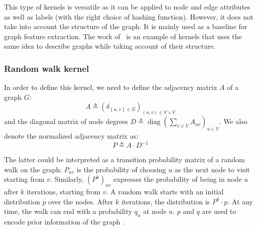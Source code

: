             This type of kernels is versatile as it can be applied to node and edge attributes as well as labels (with the right choice of hashing function).
            However, it does not take into account the structure of the graph.
            It is mainly used as a baseline for graph feature extraction.
            The work of~\textcite{shervashidze2011weisfeiler} is an example of kernels that uses the same idea to describe graphs while taking account of their structure.

        \subsubsection{Random walk kernel}
            In order to define this kernel, we need to define the adjacency matrix $A$ of a graph $G$:
            \begin{equation}
                \label{eq::adjacency_matrix}
                A \triangleq \left(\delta_{\left\{u,v\right\}\in E}\right)_{(u, v) \in V\times V}
            \end{equation}
            and the diagonal matrix of node degrees $D\triangleq \operatorname{diag}\left(\sum_{v \in V}A_{uv}\right)_{u \in V}$.
            We also denote the normalized adjacency matrix as:
            \begin{equation}
                \label{eq::normalized_adjacency_matrix}
                P \triangleq A\cdot D^{-1}
            \end{equation}

            The latter could be interpreted as a transition probability matrix of a random walk on the graph:
            $P_{uv}$ is the probability of choosing $u$ as the next node to visit starting from $v$.
            Similarly, $\left(P^k\right)_{uv}$ expresses the probability of being in node $u$ after $k$ iterations, starting from $v$.
            A random walk starts with an initial distribution $p$ over the nodes.
            After $k$ iterations, the distribution is $P^k\cdot p$.
            At any time, the walk can end with a probability $q_u$ at node $u$.
            $p$ and $q$ are used to encode prior information of the graph~\parencite{vishwanathan2010graph}.\\
            
